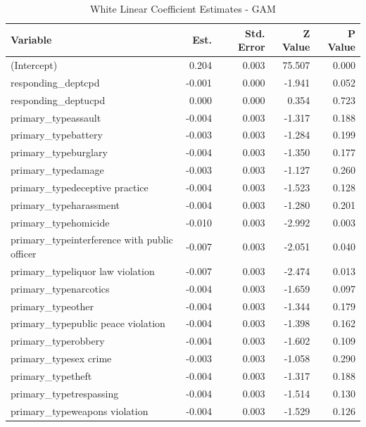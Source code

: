 \documentclass{ucetd}
\begin{document}
\begin{table}

\caption{\label{tab:white-gam}White Linear Coefficient Estimates - GAM}
\centering
\begin{tabular}[t]{l|r|r|r|r}
\hline
Variable & Est. & Std. Error & Z Value & P Value\\
\hline
(Intercept) & 0.204 & 0.003 & 75.507 & 0.000\\
\hline
responding\_deptcpd & -0.001 & 0.000 & -1.941 & 0.052\\
\hline
responding\_deptucpd & 0.000 & 0.000 & 0.354 & 0.723\\
\hline
primary\_typeassault & -0.004 & 0.003 & -1.317 & 0.188\\
\hline
primary\_typebattery & -0.003 & 0.003 & -1.284 & 0.199\\
\hline
primary\_typeburglary & -0.004 & 0.003 & -1.350 & 0.177\\
\hline
primary\_typedamage & -0.003 & 0.003 & -1.127 & 0.260\\
\hline
primary\_typedeceptive practice & -0.004 & 0.003 & -1.523 & 0.128\\
\hline
primary\_typeharassment & -0.004 & 0.003 & -1.280 & 0.201\\
\hline
primary\_typehomicide & -0.010 & 0.003 & -2.992 & 0.003\\
\hline
primary\_typeinterference with public officer & -0.007 & 0.003 & -2.051 & 0.040\\
\hline
primary\_typeliquor law violation & -0.007 & 0.003 & -2.474 & 0.013\\
\hline
primary\_typenarcotics & -0.004 & 0.003 & -1.659 & 0.097\\
\hline
primary\_typeother & -0.004 & 0.003 & -1.344 & 0.179\\
\hline
primary\_typepublic peace violation & -0.004 & 0.003 & -1.398 & 0.162\\
\hline
primary\_typerobbery & -0.004 & 0.003 & -1.602 & 0.109\\
\hline
primary\_typesex crime & -0.003 & 0.003 & -1.058 & 0.290\\
\hline
primary\_typetheft & -0.004 & 0.003 & -1.317 & 0.188\\
\hline
primary\_typetrespassing & -0.004 & 0.003 & -1.514 & 0.130\\
\hline
primary\_typeweapons violation & -0.004 & 0.003 & -1.529 & 0.126\\
\hline
\end{tabular}
\end{table}
\end{document}

